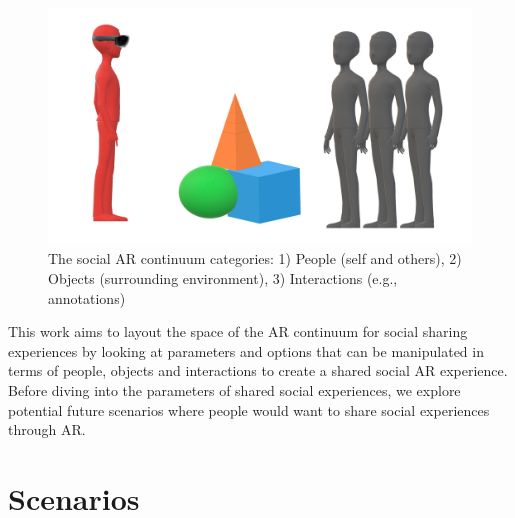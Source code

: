 
\begin{figure}[h]
    \centering
    \includegraphics[width=.8\linewidth]{images/continuum_categories5.png}
    \caption{The social AR continuum categories: 1) People (self and others), 2) Objects (surrounding environment), 3) Interactions (e.g., annotations)}
    \label{fig:continuum:categories}
\end{figure}

This work aims to layout the space of the AR continuum for social sharing experiences by looking at parameters and options that can be manipulated in terms of people, objects and interactions to create a shared social AR experience. Before diving into the parameters of shared social experiences, we explore potential future scenarios where people would want to share social experiences through AR.

\section{Scenarios}

